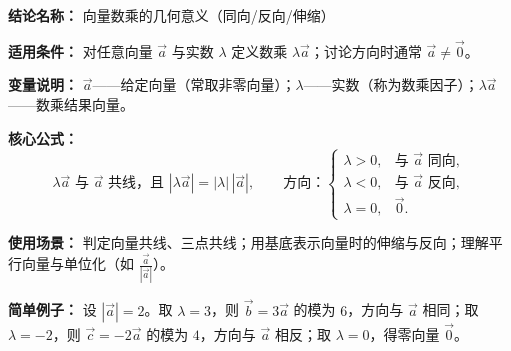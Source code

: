 \textbf{结论名称：} 向量数乘的几何意义（同向/反向/伸缩）

\textbf{适用条件：} 对任意向量 $\vec{a}$ 与实数 $\lambda$ 定义数乘 $\lambda\vec{a}$；讨论方向时通常 $\vec{a}\neq\vec{0}$。

\textbf{变量说明：} $\vec{a}$——给定向量（常取非零向量）；$\lambda$——实数（称为数乘因子）；$\lambda\vec{a}$——数乘结果向量。

\textbf{核心公式：} 
\[
\boxed{\lambda\vec{a} \text{ 与 } \vec{a} \text{ 共线，且 } |\lambda\vec{a}| = |\lambda|\,|\vec{a}|,\qquad 
\text{方向：} \begin{cases}
\lambda>0, & \text{与 }\vec{a}\text{ 同向},\\
\lambda<0, & \text{与 }\vec{a}\text{ 反向},\\
\lambda=0, & \vec{0}.
\end{cases}}
\]

\textbf{使用场景：} 判定向量共线、三点共线；用基底表示向量时的伸缩与反向；理解平行向量与单位化（如 $\frac{\vec{a}}{|\vec{a}|}$）。

\textbf{简单例子：} 设 $|\vec{a}|=2$。取 $\lambda=3$，则 $\vec{b}=3\vec{a}$ 的模为 $6$，方向与 $\vec{a}$ 相同；取 $\lambda=-2$，则 $\vec{c}=-2\vec{a}$ 的模为 $4$，方向与 $\vec{a}$ 相反；取 $\lambda=0$，得零向量 $\vec{0}$。